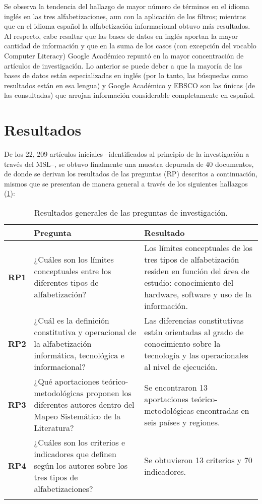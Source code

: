 \documentclass[spanish]{textolivre}
\begin{document}
Se observa la tendencia del hallazgo de mayor número de términos en el idioma inglés en las tres alfabetizaciones, aun con la aplicación de los filtros; mientras que en el idioma español la alfabetización informacional obtuvo más resultados. Al respecto, cabe resaltar que las bases de datos en inglés aportan la mayor cantidad de información y que en la suma de los casos (con excepción del vocablo Computer Literacy) Google Académico repuntó en la mayor concentración de artículos de investigación. Lo anterior se puede deber a que la mayoría de las bases de datos están especializadas en inglés (por lo tanto, las búsquedas como resultados están en esa lengua) y Google Académico y EBSCO son las únicas (de las consultadas) que arrojan información considerable completamente en español.

\section{Resultados}\label{sec-resultados}
De los 22, 209 artículos iniciales –identificados al principio de la investigación a través del MSL–, se obtuvo finalmente una muestra depurada de 40 documentos, de donde se derivan los resultados de las preguntas (RP) descritos a continuación, mismos que se presentan de manera general a través de los siguientes hallazgos (\cref{tbl06}): 

\begin{table}[htpb]
\caption{Resultados generales de las preguntas de investigación.}
\label{tbl06}
\begin{tabular}{lp{6.5cm}p{6.5cm}}
\toprule
 & Pregunta & Resultado \\
\midrule
\arrayrulecolor[gray]{.7}
\textbf{RP1} &
  ¿Cuáles son los límites conceptuales entre los diferentes tipos de alfabetización?  &
  Los límites conceptuales de los tres tipos de alfabetización residen en función del área de estudio: conocimiento del hardware, software y uso de la información.
  \\ \midrule
\textbf{RP2} &
  ¿Cuál es la definición constitutiva y operacional de la alfabetización informática, tecnológica e informacional? &
  Las diferencias constitutivas están orientadas al grado de conocimiento sobre la tecnología y las operacionales al nivel de ejecución.
  \\ \midrule
\textbf{RP3} &
  ¿Qué aportaciones teórico-metodológicas proponen los diferentes autores dentro del Mapeo Sistemático de la Literatura? &
  Se encontraron 13 aportaciones teórico-metodológicas encontradas en seis países y regiones. 
  \\ \midrule
\textbf{RP4} &
  ¿Cuáles son los criterios e indicadores que definen según los autores sobre los tres tipos de alfabetizaciones? &
  Se obtuvieron 13 criterios y 70 indicadores.
  \\ \arrayrulecolor{black}
\bottomrule
\end{tabular}
\end{table}
\end{document}
